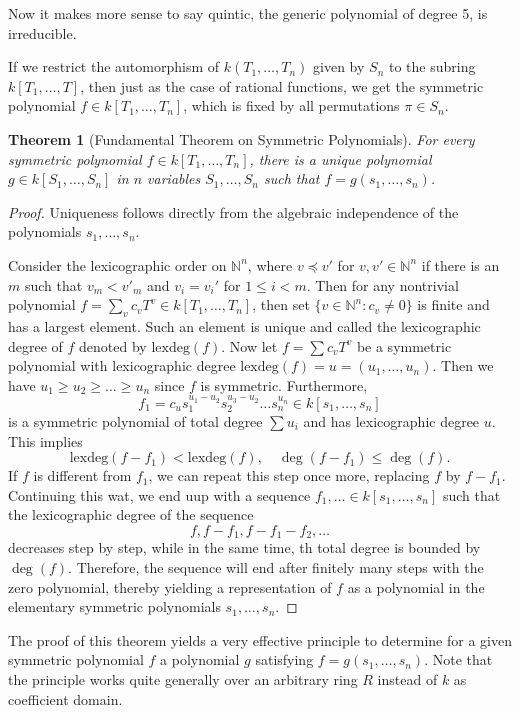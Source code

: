 \documentclass[12pt]{report}
\newtheorem{theorem}{Theorem}[section]
\theoremstyle{definition}
\newcommand{\lex}{\mbox{lexdeg}}
\newcommand{\NN}{\mathbb{N}}
\begin{document}
Now it makes more sense to say quintic, the generic polynomial of degree 5, is irreducible.


If we restrict the automorphism of $k(T_1,\dots,T_n)$ given by $S_n$ to the subring $k[T_1,\dots,T]$, then just as the case of rational functions, we get the symmetric polynomial $f\in k[T_1,\dots,T_n]$, which is fixed by all permutations $\pi\in S_n$.

\begin{theorem}[Fundamental Theorem on Symmetric Polynomials]
	For every symmetric polynomial $f\in k[T_1,\dots,T_n]$, there is a unique polynomial $g\in k[S_1,\dots,S_n]$ in $n$ variables $S_1,\dots,S_n$ such that $f=g(s_1,\dots,s_n)$.
\end{theorem}

\begin{proof}
	Uniqueness follows directly from the algebraic independence of the polynomials $s_1,\dots,s_n$.


	Consider the lexicographic order on $\NN^n$, where $v\preceq v'$ for $v,v'\in \NN^n$ if there is an $m$ such that $v_m<v'_m$ and $v_i=v_i'$ for $1\leq i<m$. Then for any nontrivial polynomial $f=\sum_{v} c_vT^v\in k[T_1,\dots, T_n]$, then set $\{v\in \NN^n: c_v\not=0\}$ is finite and has a largest element. Such an element is unique and called the lexicographic degree of $f$ denoted by $\lex(f)$. Now let $f= \sum c_v T^v$ be a symmetric polynomial with lexicographic degree $\lex(f)=u=(u_1,\dots,u_n)$. Then we have $u_1\geq u_2\geq \dots\geq u_n$ since $f$ is symmetric. Furthermore, $$f_1=c_u s_1^{u_1-u_2} s_2^{u_3-u_2}\dots s_n^{u_n}\in k[s_1,\dots,s_n]$$ is a symmetric polynomial of total degree $\sum u_i$ and has lexicographic degree $u$. This implies 
	$$\lex(f-f_1)<\lex(f),\quad \deg(f-f_1)\leq \deg(f).$$
	If $f$ is different from $f_1$, we can repeat this step once more, replacing $f$ by $f-f_1$. Continuing this wat, we end uup with a sequence $f_1,\dots \in k[s_1,\dots,s_n]$ such that the lexicographic degree of the sequence 
	$$f,f-f_1,f-f_1-f_2,\dots$$ decreases step by step, while in the same time, th total degree is bounded by $\deg(f)$. Therefore, the sequence will end after finitely many steps with the zero polynomial, thereby yielding a representation of $f$ as a polynomial in the elementary symmetric polynomials $s_1,\dots,s_n$.
\end{proof}


The proof of this theorem yields a very effective principle to determine for a given symmetric polynomial $f$ a polynomial $g$ satisfying $f = g(s_1,\dots,s_n).$ Note that the principle works quite generally over an arbitrary ring $R$ instead of $k$ as coefficient domain.
\end{document}
